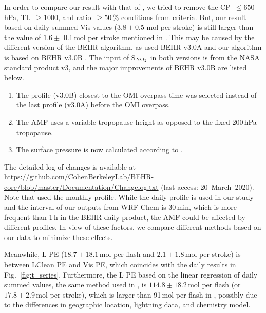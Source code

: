 \documentclass[amt]{copernicus}
\begin{document}
In order to compare our result with that of \citet{Lapierre.2020}, we tried to remove the CP~$\leq 650$\,hPa, TL~$\geq 1000$, and ratio~$\geq 50$\,{\%} conditions from criteria.
But, our result based on daily summed Vis values ($3.8 \pm 0.5$ mol per stroke) is still larger than the value of $1.6 \pm$ 0.1\,mol per stroke mentioned in \citet{Lapierre.2020}.
This may be caused by the different version of the BEHR algorithm, as \citet{Lapierre.2020} used BEHR v3.0A and our algorithm is based on BEHR v3.0B \citep{Laughner.2019}.
The input of S$_\chem{NO_2}$ in both versions is from the NASA standard product v3, and the major improvements of BEHR v3.0B are listed below.
\begin{enumerate}
\item The profile (v3.0B) closest to the OMI overpass time was selected instead of the last profile (v3.0A) before the OMI overpass.

\item The AMF uses a variable tropopause height as opposed to the fixed 200\,hPa tropopause.

\item The surface pressure is now calculated according to \citet{Zhou.2009}.
\end{enumerate}
The detailed log of changes is available at \url{https://github.com/CohenBerkeleyLab/BEHR-core/blob/master/Documentation/Changelog.txt} (last access: 20~March~2020).
Note that \citet{Lapierre.2020} used the monthly  profile. While the daily profile is used in our study and the interval of our outputs from WRF-Chem is 30\,min, which is more frequent than 1\,h in the BEHR daily product,
the AMF could be affected by different  profiles.
In view of these factors, we compare different methods based on our data to minimize these effects.

Meanwhile, L PE ($18.7 \pm 18.1$\,mol per flash and $2.1\pm 1.8$\,mol per stroke) is between LClean PE and Vis PE, which coincides with the daily results in Fig.~\ref{fig:t_series}.
Furthermore, the L PE based on the linear regression of daily summed values,
the same method used in \citet{Pickering.2016},
is $114.8 \pm 18.2$\,mol per flash (or $17.8 \pm 2.9$\,mol per stroke), which is larger than 91\,mol per flash in \citet{Pickering.2016},
possibly due to the differences in geographic location, lightning data, and chemistry model.
\end{document}

